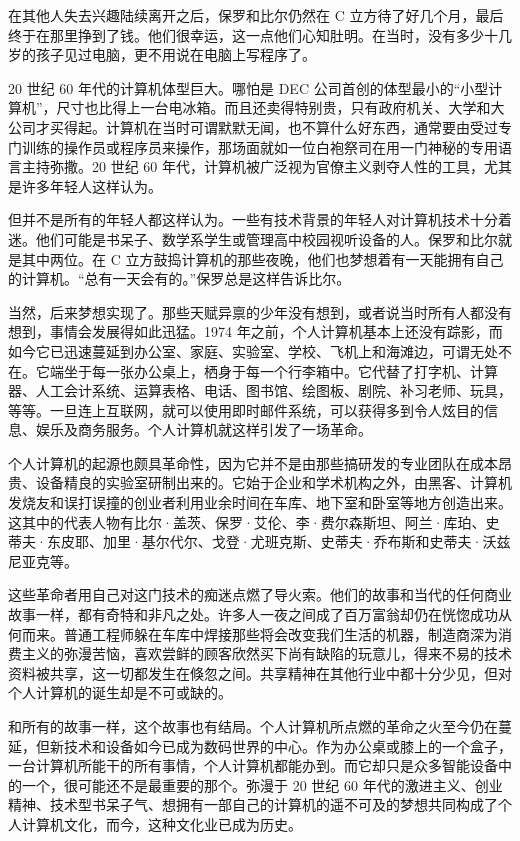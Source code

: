 \documentclass[12pt,UTF8]{ctexbook}
\begin{document}
在其他人失去兴趣陆续离开之后，保罗和比尔仍然在 C 立方待了好几个月，最后终于在那里挣到了钱。他们很幸运，这一点他们心知肚明。在当时，没有多少十几岁的孩子见过电脑，更不用说在电脑上写程序了。

20 世纪 60 年代的计算机体型巨大。哪怕是 DEC 公司首创的体型最小的“小型计算机”，尺寸也比得上一台电冰箱。而且还卖得特别贵，只有政府机关、大学和大公司才买得起。计算机在当时可谓默默无闻，也不算什么好东西，通常要由受过专门训练的操作员或程序员来操作，那场面就如一位白袍祭司在用一门神秘的专用语言主持弥撒。20 世纪 60 年代，计算机被广泛视为官僚主义剥夺人性的工具，尤其是许多年轻人这样认为。

但并不是所有的年轻人都这样认为。一些有技术背景的年轻人对计算机技术十分着迷。他们可能是书呆子、数学系学生或管理高中校园视听设备的人。保罗和比尔就是其中两位。在 C 立方鼓捣计算机的那些夜晚，他们也梦想着有一天能拥有自己的计算机。“总有一天会有的。”保罗总是这样告诉比尔。

当然，后来梦想实现了。那些天赋异禀的少年没有想到，或者说当时所有人都没有想到，事情会发展得如此迅猛。1974 年之前，个人计算机基本上还没有踪影，而如今它已迅速蔓延到办公室、家庭、实验室、学校、飞机上和海滩边，可谓无处不在。它端坐于每一张办公桌上，栖身于每一个行李箱中。它代替了打字机、计算器、人工会计系统、运算表格、电话、图书馆、绘图板、剧院、补习老师、玩具，等等。一旦连上互联网，就可以使用即时邮件系统，可以获得多到令人炫目的信息、娱乐及商务服务。个人计算机就这样引发了一场革命。

个人计算机的起源也颇具革命性，因为它并不是由那些搞研发的专业团队在成本昂贵、设备精良的实验室研制出来的。它始于企业和学术机构之外，由黑客、计算机发烧友和误打误撞的创业者利用业余时间在车库、地下室和卧室等地方创造出来。这其中的代表人物有比尔·盖茨、保罗·艾伦、李·费尔森斯坦、阿兰·库珀、史蒂夫·东皮耶、加里·基尔代尔、戈登·尤班克斯、史蒂夫·乔布斯和史蒂夫·沃兹尼亚克等。

这些革命者用自己对这门技术的痴迷点燃了导火索。他们的故事和当代的任何商业故事一样，都有奇特和非凡之处。许多人一夜之间成了百万富翁却仍在恍惚成功从何而来。普通工程师躲在车库中焊接那些将会改变我们生活的机器，制造商深为消费主义的弥漫苦恼，喜欢尝鲜的顾客欣然买下尚有缺陷的玩意儿，得来不易的技术资料被共享，这一切都发生在倏忽之间。共享精神在其他行业中都十分少见，但对个人计算机的诞生却是不可或缺的。

和所有的故事一样，这个故事也有结局。个人计算机所点燃的革命之火至今仍在蔓延，但新技术和设备如今已成为数码世界的中心。作为办公桌或膝上的一个盒子，一台计算机所能干的所有事情，个人计算机都能办到。而它却只是众多智能设备中的一个，很可能还不是最重要的那个。弥漫于 20 世纪 60 年代的激进主义、创业精神、技术型书呆子气、想拥有一部自己的计算机的遥不可及的梦想共同构成了个人计算机文化，而今，这种文化业已成为历史。
\end{document}
